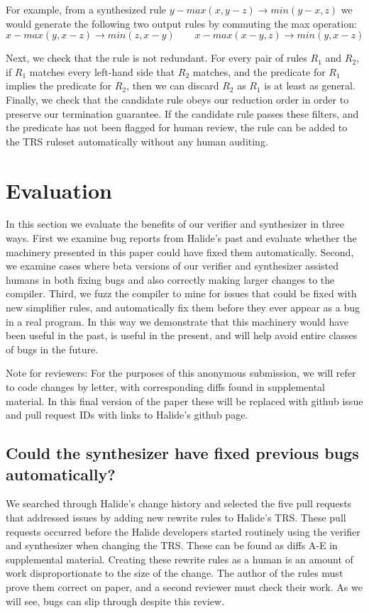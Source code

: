 \documentclass[acmsmall,review,anonymous]{acmart}\settopmatter{printfolios=true,printccs=false,printacmref=false}
\begin{document}
For example, from a synthesized rule $y - max(x, y - z) \rightarrow min(y - x, z)$ we would generate the following two
output rules by commuting the max operation:
\[
x - max(y, x - z) \rightarrow min(z, x - y) \qquad x - max(x - y, z) \rightarrow min(y, x - z)
\]

Next, we check that the rule is not redundant. For every pair of rules
$R_1$ and $R_2$, if $R_1$ matches every left-hand side that $R_2$
matches, and the predicate for $R_1$ implies the predicate for $R_2$,
then we can discard $R_2$ as $R_1$ is at least as general. Finally, we
check that the candidate rule obeys our reduction order in order to
preserve our termination guarantee. If the candidate rule passes these
filters, and the predicate has not been flagged for human review, the
rule can be added to the TRS ruleset automatically without any human
auditing.

\section{Evaluation}

In this section we evaluate the benefits of our verifier and synthesizer in three ways. First we examine bug reports from Halide’s past and evaluate whether the machinery presented in this paper could have fixed them automatically. Second, we examine cases where beta versions of our verifier and synthesizer assisted humans in both fixing bugs and also correctly making larger changes to the compiler. Third, we fuzz the compiler to mine for issues that could be fixed with new simplifier rules, and automatically fix them before they ever appear as a bug in a real program. In this way we demonstrate that this machinery would have been useful in the past, is useful in the present, and will help avoid entire classes of bugs in the future.

Note for reviewers: For the purposes of this anonymous submission, we will refer to code changes by letter, with corresponding diffs found in supplemental material. In this final version of the paper these will be replaced with github issue and pull request IDs with links to Halide’s github page.

\subsection{Could the synthesizer have fixed previous bugs automatically?}

We searched through Halide’s change history and selected the five pull requests that addressed issues by adding new rewrite rules to Halide’s TRS. These pull requests occurred before the Halide developers started routinely using the verifier and synthesizer when changing the TRS. These can be found as diffs A-E in supplemental material. Creating these rewrite rules as a human is an amount of work disproportionate to the size of the change. The author of the rules must prove them correct on paper, and a second reviewer must check their work. As we will see, bugs can slip through despite this review. 
\end{document}
